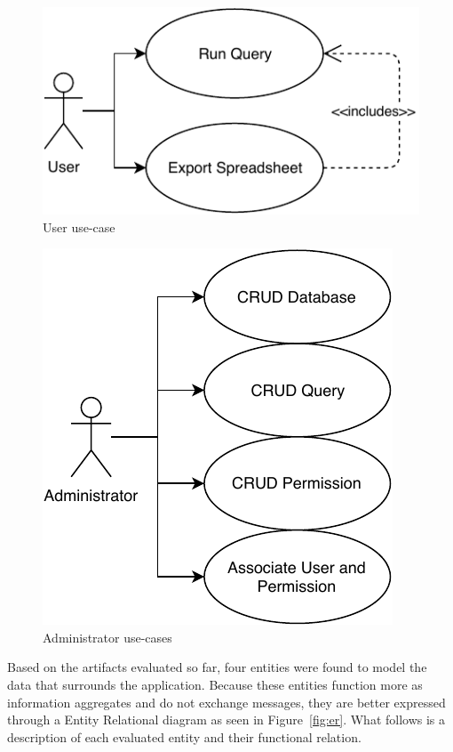 \begin{figure}
  \centering
  \includegraphics[width=.5\textwidth]{images/diagramas/userusecase}
  \caption{User use-case}\label{fig:userusecase}
\end{figure}

\begin{figure}
  \centering
  \includegraphics[width=.5\textwidth]{images/diagramas/adminusecase}
  \caption{Administrator use-cases}\label{fig:adminusecases}
\end{figure}

Based on the artifacts evaluated so far, four entities were found to model the data that surrounds the application. Because these entities function more as information aggregates and do not exchange messages, they are better expressed through a Entity Relational diagram as seen in Figure~\ref{fig:er}. What follows is a description of each evaluated entity and their functional relation.

